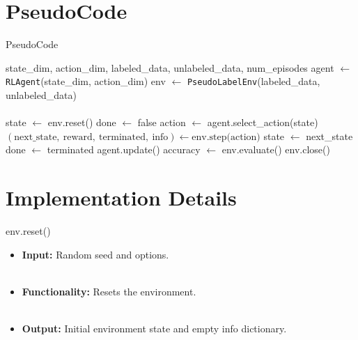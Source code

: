 \documentclass{beamer}
\begin{document}

\section{PseudoCode}
\begin{frame}{PseudoCode}
  \begin{algorithm}[H]
    \caption{RL agent training loop}
    \label{alg:rl_training_algpseudocode}
    \scriptsize
    \begin{algorithmic}
      \Require state\_dim, action\_dim, labeled\_data, unlabeled\_data, num\_episodes
      \State agent $\leftarrow$ \texttt{RLAgent}(state\_dim, action\_dim)
      \State env $\leftarrow$ \texttt{PseudoLabelEnv}(labeled\_data, unlabeled\_data) \\~\\
      \State state $\leftarrow$ env.reset()
      \State done $\leftarrow$ false
      \State action $\leftarrow$ agent.select\_action(state)
      \State $(\text{next\_state},\ \text{reward},\ \text{terminated},\ \text{info}) \leftarrow \text{env.step(action)}$
      \State state $\leftarrow$ next\_state
      \State done $\leftarrow$ terminated
      \EndWhile
      \State agent.update()
      \State accuracy $\leftarrow$ env.evaluate()
      \EndFor
      \State env.close()
    \end{algorithmic}
  \end{algorithm}
\end{frame}


\section{Implementation Details}

\begin{frame}[fragile]{env.reset()}
  \begin{itemize}
       \\~\\
    \item \textbf{Input:} Random seed and options. \\~\\
    \item \textbf{Functionality:} Resets the environment. \\~\\ %
      \begin{itemize}
      \end{itemize}
    \item \textbf{Output:} Initial environment state and empty info dictionary.
  \end{itemize}
\end{frame}
\end{document}
